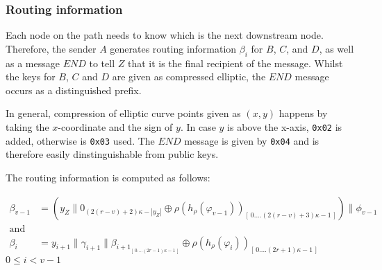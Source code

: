 \subsubsection{Routing information}
Each node on the path needs to know which is the next downstream node. Therefore, the sender $A$ generates routing information $\beta_i$ for $B$, $C$, and $D$, as well as a message $END$ to tell $Z$ that it is the final recipient of the message. Whilst the keys for $B$, $C$ and $D$ are given as compressed elliptic, the $END$ message occurs as a distinguished prefix.

In general, compression of elliptic curve points given as $(x,y)$ happens by taking the $x$-coordinate and the sign of $y$. In case $y$ is above the x-axis, \texttt{0x02} is added, otherwise is \texttt{0x03} used. The $END$ message is given by \texttt{0x04} and is therefore easily dinstinguishable from public keys.

\begin{comment}
The $END$ message is a distinguished prefix byte which is added to the final recipient's compressed public key. For ECDSA public key compression, only the $x$ coordinate is used and is prepended by $02$.

The $y$ coordinate is extracted from $x$ by resolving the secp256k1 elliptic curve equation $Y^2=X^3+7$ \cite{secp}. A square root extraction will yield $Y$ or $-Y$. The compressed point format includes the least significant bit of $Y$ in the first byte (the first byte is $0\times02$ or $0\times03$, depending on that bit).
\end{comment}

The routing information is computed as follows:

\begin{align}
    \beta_{v-1} & =(y_Z\|0_{(2(r-v)+2)\kappa-|y_Z|}\oplus \rho(h_{\rho}(\varphi_{v-1}))_{[ \,0....(2(r-v)+3)\kappa-1\,]})\|\phi_{v-1}                \\
    \text{and}  & \nonumber                                                                                                                          \\
    \beta_i     & =y_{i+1}\|\gamma_{i+1}\|\beta_{{i+1}_{[ \,0....(2r-1)\kappa-1\,] }}\oplus \rho(h_{\rho}(\varphi_{i}))_{[ \,0....(2r+1)\kappa-1\,]}
    \label{eq:2}
\end{align}
$0\le i < v-1$

